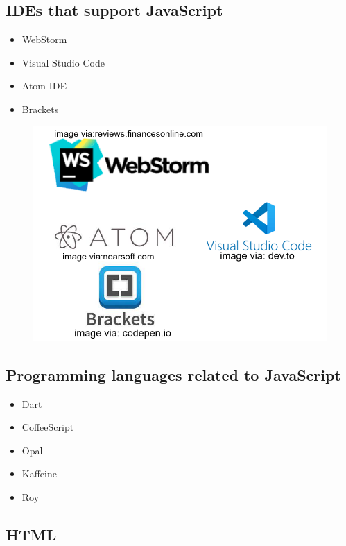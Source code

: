 \documentclass[12pt]{article}
\begin{document}
\newpage

\subsection{IDEs that support JavaScript}
           \begin{itemize}
           	\item WebStorm
           	\item Visual Studio Code
           	\item Atom IDE
           	\item Brackets
           \end{itemize}

\begin{figure}[h]
	\includegraphics[width=0.7\linewidth]{screenshot014}
	\caption{}
	\label{fig:screenshot014}
\end{figure}

\newpage

\subsection{Programming languages related to JavaScript}
           \begin{itemize}
           	\item Dart
           	\item CoffeeScript
           	\item Opal
           	\item Kaffeine
           	\item Roy
           \end{itemize}

\newpage

\subsection{HTML}
\end{document}
